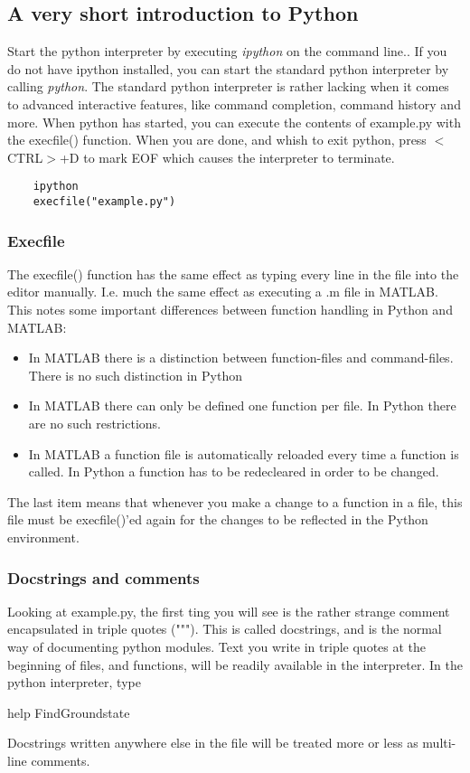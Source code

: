 \subsection{A very short introduction to Python}
Start the python interpreter by executing \textit{ipython} on the command line.. If you do not have ipython installed, 
you can start the standard python interpreter by calling \textit{python}. The standard python 
interpreter is rather lacking when it comes to advanced interactive features, like command completion, command history and more. When python has started, you can execute the contents of example.py with the execfile() function. When you are done, 
and whish to exit python, press $<$CTRL$>$+D to mark EOF which causes the interpreter to terminate.
\begin{verbatim}
	ipython
	execfile("example.py")
\end{verbatim}

\subsubsection*{Execfile}
The execfile() function has the same effect as typing every line in the file into the editor manually. I.e. much the 
same effect as executing a .m file in MATLAB. This notes some important differences between function handling in 
Python and MATLAB:
\begin{itemize}
\item In MATLAB there is a distinction between function-files and command-files. There is no such distinction in Python
\item In MATLAB there can only be defined one function per file. In Python there are no such restrictions.
\item In MATLAB a function file is automatically reloaded every time a function is called. In Python a function has to
be redecleared in order to be changed. 
\end{itemize}
The last item means that whenever you make a change to a function in a file, this file must be execfile()'ed again for the
changes to be reflected in the Python environment.

\subsubsection*{Docstrings and comments}
Looking at example.py, the first ting you will see is the rather strange comment encapsulated in triple quotes ("""). This
is called docstrings, and is the normal way of documenting python modules. Text you write in triple quotes at the beginning 
of files, and functions, will be readily available in the interpreter. In the python interpreter, type
\begin{python}
	help FindGroundstate
\end{python}
Docstrings written anywhere else in the file will be treated more or less as multi-line comments. 


